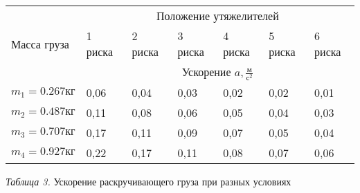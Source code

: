 \begin{center}
    \begin{tabular}{|p{2.5cm}|p{2cm}|p{2cm}|p{2cm}|p{2cm}|p{2cm}|p{2cm}|}
        \hline
        \multirow{3}{*}{Масса груза} & \multicolumn{6}{c|}{Положение утяжелителей} \\
        \cline{2-7}
        & 1 риска       & 2 риска & 3 риска & 4 риска & 5 риска & 6 риска \\
        \cline{2-7}
        & \multicolumn{6}{c|}{Ускорение $a, \frac{\text{м}}{\text{с}^2}$} \\
        \hline
        $m_1 = 0.267 \text{кг}$ &   0,06    &   0,04    &    0,03   &    0,02   &    0,02   &   0,01    \\
        \hline
        $m_2 = 0.487 \text{кг}$ &   0,11    &   0,08    &    0,06   &    0,05   &    0,04   &   0,03    \\
        \hline
        $m_3 = 0.707 \text{кг}$ &   0,17    &   0,11    &    0,09   &    0,07   &    0,05   &   0,04    \\
        \hline
        $m_4 = 0.927 \text{кг}$ &   0,22    &   0,17    &    0,11   &    0,08   &    0,07   &   0,06    \\
        \hline

    \end{tabular}

    \smallvspace

    \textit{Таблица 3.} Ускорение раскручивающего груза при разных условиях
\end{center}

